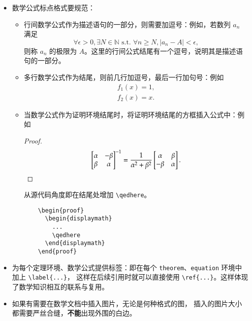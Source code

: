 \begin{itemize}
  \item 数学公式标点格式要规范：
    \begin{itemize}
      \item 行间数学公式作为描述语句的一部分，则需要加逗号：例如，若数列 $a_n$ 满足
      \begin{equation}
        \label{eq:punctation1}
        \forall \epsilon > 0, \exists N \in \mathbb{N} \text{ s.t. } \forall n \geq N, |a_n - A| < \epsilon,
      \end{equation}
        则称 $a_n$ 的极限为 $A$。这里的行间公式结尾有一个逗号，说明其是描述语句的一部分。
      \item 多行数学公式作为结尾，则前几行加逗号，最后一行加句号：例如
      \begin{align}
        \label{eq:punctation2}
        f_1(x) = 1, \\
        f_2(x) = x.
      \end{align}
    \item 当数学公式作为证明环境结尾时，将证明环境结尾的方框插入公式中：例如
    \begin{proof}
      \begin{displaymath}
        \begin{bmatrix}
          \alpha & -\beta
          \\
          \beta & \alpha
        \end{bmatrix}^{-1}
        =
        \frac{1}{\alpha^2+\beta^2}
        \begin{bmatrix}
          \alpha & \beta
          \\
          -\beta & \alpha
        \end{bmatrix}.
        \qedhere
      \end{displaymath}
    \end{proof}
    从源代码角度即在结尾处增加 \lstinline|\qedhere|。

    \begin{lstlisting}
    \begin{proof}
      \begin{displaymath}
        ...
        \qedhere
      \end{displaymath}
    \end{proof}
    \end{lstlisting}

  \end{itemize}
  \item 为每个定理环境、数学公式提供标签：即在每个 \lstinline|theorem|、\lstinline|equation| 
  环境中加上 \lstinline|\label{...}|，
  这样在后续引用时就可以直接使用 \lstinline|\ref{...}|。这样体现了数学知识相互的联系与复用。
  \item 如果有需要在数学文档中插入图片，无论是何种格式的图，
  插入的图片大小都需要严丝合缝，\textbf{不能}出现外围的白边。
\end{itemize}

